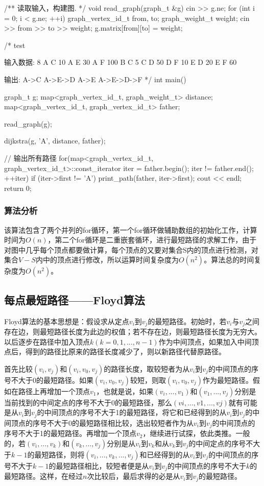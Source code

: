 \begin{Codex}[label=al_graph_dijkstra.cpp]
/** 读取输入，构建图. */
void read_graph(graph_t &g) {
    cin >> g.ne;
    for (int i = 0; i < g.ne; ++i) {
        graph_vertex_id_t from, to;
        graph_weight_t weight;
        cin >> from >> to >> weight;
        g.matrix[from][to] = weight;
    }
}

/* test

输入数据:
8
A C 10
A E 30
A F 100
B C 5
C D 50
D F 10
E D 20
E F 60

输出:
A->C
A->E->D
A->E
A->E->D->F
*/
int main() {
    graph_t g;
    map<graph_vertex_id_t, graph_weight_t> distance;
    map<graph_vertex_id_t, graph_vertex_id_t> father;

    read_graph(g);

    dijkstra(g, 'A', distance, father);

    // 输出所有路径
    for(map<graph_vertex_id_t, graph_vertex_id_t>::const_iterator iter =
            father.begin(); iter != father.end();  ++iter) {
        if (iter->first != 'A') {
            print_path(father, iter->first);
            cout << endl;
        }
    }
    return 0;
}
\end{Codex}

\subsubsection{算法分析}
该算法包含了两个并列的for循环，第一个for循环做辅助数组的初始化工作，计算时间为$O(n)$，第二个for循环是二重嵌套循环，进行最短路径的求解工作，由于对图中几乎每个顶点都要做计算，每个顶点的又要对集合S内的顶点进行检测，对集合$V-S$内中的顶点进行修改，所以运算时间复杂度为$O(n^2)$。算法总的时间复杂度为$O(n^2)$。


\subsection{每点最短路径——Floyd算法}
Floyd算法的基本思想是：假设求从定点$v_i$到$v_j$的最短路径。初始时，若$v_i$与$v_j$之间存在边，则最短路径长度为此边的权值；若不存在边，则最短路径长度为无穷大。以后逐步在路径中加入顶点$k(k=0,1,...,n-1)$作为中间顶点，如果加入中间顶点后，得到的路径比原来的路径长度减少了，则以新路径代替原路径。

首先比较$(v_i,v_j)$和$(v_i,v_0,v_j)$的路径长度，取较短者为从$v_i$到$v_j$的中间顶点的序号不大于0的最短路径。如果$(v_i,v_0,v_j)$较短，则取$(v_i,v_0,v_j)$作为最短路径。假如在路径上再增加一个顶点$v_1$，也就是说，如果$(v_i,...,v_1)$和$(v_1,...,v_j)$分别是当前找到的中间定点的序号不大于0的最短路径，那么$(vi,...,v1,...,vj)$就有可能是从$v_i$到$v_j$的中间顶点的序号不大于1的最短路径，将它和已经得到的从$v_i$到$v_j$的中间顶点的序号不大于0的最短路径相比较，选出较短者作为从$v_i$到$v_j$的中间顶点的序号不大于1的最短路径。再增加一个顶点$v_2$，继续进行试探，依此类推。一般的，若$(v_i,...,v_k)$和$(v_k,...,v_j)$分别是从$v_i$到$v_k$和从$v_k$到$v_j$的中间定点的序号不大于$k-1$的最短路径，则将$(v_i,...,v_k,...,v_j)$和已经得到的从$v_i$到$v_j$的中间顶点的序号不大于$k-1$的最短路径相比，较短者便是从$v_i$到$v_j$的中间顶点的序号不大于$k$的最短路径。这样，在经过$n$次比较后，最后求得的必是从$v_i$到$v_j$的最短路径。

